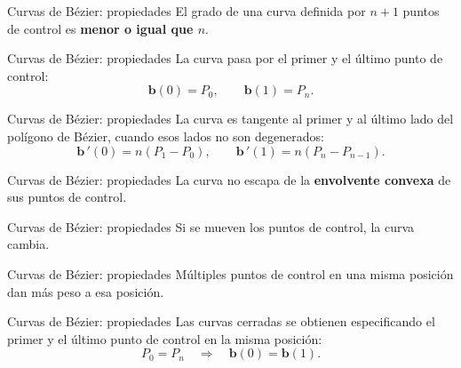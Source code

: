 \documentclass[main.tex]{subfiles}
\begin{document}
\begin{frame}[t]{Curvas de Bézier: propiedades}
El grado de una curva definida por $n+1$ puntos de control es \textbf{menor o igual que $n$}.
\end{frame}

\begin{frame}[t]{Curvas de Bézier: propiedades}
La curva pasa por el primer y el último punto de control:\[\mathbf b(0)=P_0,\qquad\mathbf b(1)=P_n.\]
\end{frame}

\begin{frame}[t]{Curvas de Bézier: propiedades}
La curva es tangente al primer y al último lado del polígono de Bézier, cuando esos lados no son degenerados:\[\mathbf b\,\!\prime(0)=n(P_1-P_0),\qquad\mathbf b\,\!\prime(1)=n(P_n-P_{n-1}).\]
\end{frame}

\begin{frame}[t]{Curvas de Bézier: propiedades}
La curva no escapa de la \textbf{envolvente convexa} de sus puntos de control.
\end{frame}

\begin{frame}[t]{Curvas de Bézier: propiedades}
Si se mueven los puntos de control, la curva cambia.
\end{frame}

\begin{frame}[t]{Curvas de Bézier: propiedades}
Múltiples puntos de control en una misma posición dan más peso a esa posición.
\end{frame}

\begin{frame}[t]{Curvas de Bézier: propiedades}
Las curvas cerradas se obtienen especificando el primer y el último punto de control en la misma posición:\[P_0=P_n\quad\Longrightarrow\quad\mathbf b(0)=\mathbf b(1).\]\begin{center}\end{center}
\end{frame}
\end{document}
